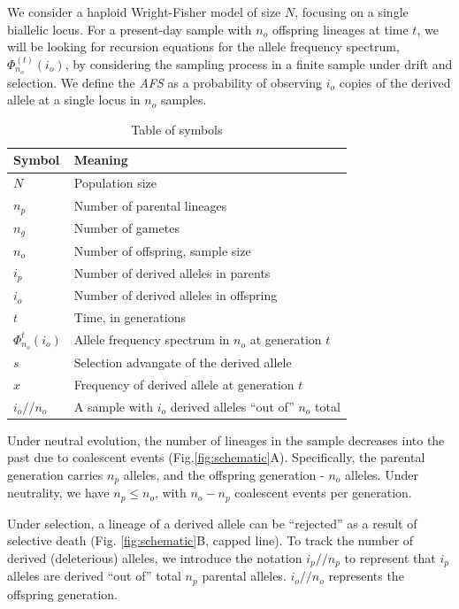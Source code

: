 \documentclass[review]{elsarticle}
\newcommand{\afs}[2]{\Phi_{#1}^{(#2)}}
\newcommand{\dslash}{/\!\!/}
\begin{document}
We consider a haploid Wright-Fisher model of size $N$, focusing on a single biallelic locus. For a
present-day sample with $n_o$ offspring lineages at time $t$, we will be looking for recursion
equations for the allele frequency spectrum, $\afs{n_o}{t}(i_o)$, by considering the sampling
process in a finite sample under drift and selection. We define the \textit{AFS} as a probability of
observing $i_o$ copies of the derived allele at a single locus in $n_o$ samples.

\begin{table}
  \centering
  \begin{tabular}{l|p{100mm}}
    Symbol & Meaning\\
    \hline
    $N$ & Population size\\
    $n_p$ & Number of parental lineages\\
    $n_g$ & Number of gametes\\
    $n_o$ & Number of offspring, sample size\\
    $i_p$ & Number of derived alleles in parents\\
    $i_o$ & Number of derived alleles in offspring\\
    $t$ & Time, in generations\\
    $\Phi_{n_o}^{t}(i_o)$ & Allele frequency spectrum in $n_o$ at generation $t$\\
    $s$ & Selection advangate of the derived allele\\
    $x$ & Frequency of derived allele at generation $t$\\
    $i_o \dslash n_o$ & A sample with $i_o$ derived alleles ``out of'' $n_o$ total\\
  \end{tabular}
  \caption{\label{tab:symbols} Table of symbols}
\end{table}

Under neutral evolution, the number of lineages in the sample decreases into the past due to
coalescent events (Fig.\ref{fig:schematic}A). Specifically, the parental generation carries $n_p$
alleles, and the offspring generation - $n_o$ alleles. Under neutrality, we have $n_p \le n_o$, with
$n_o-n_p$ coalescent events per generation.

Under selection, a lineage of a derived allele can be ``rejected'' as a result of selective death
(Fig. \ref{fig:schematic}B, capped line). To track the number of derived (deleterious) alleles, we
introduce the notation $i_p \dslash n_p$ to represent that $i_p$ alleles are derived ``out of''
total $n_p$ parental alleles. $i_o \dslash n_o$ represents the offspring generation.
\end{document}
